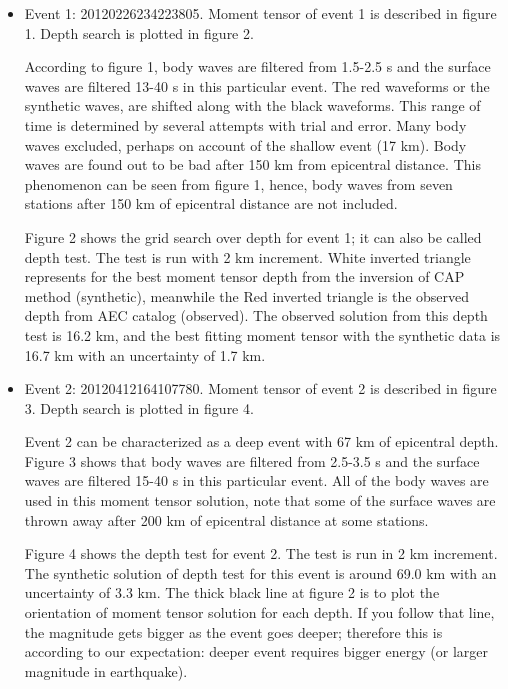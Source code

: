 \documentclass[11pt,titlepage,fleqn]{article}
\begin{document}
\begin{itemize}
\item Event 1: 20120226234223805. Moment tensor of event 1 is described in figure 1. Depth search is plotted in figure 2.

\vspace{2mm}

According to figure 1, body waves are filtered from 1.5-2.5 s and the surface waves are filtered 13-40 s in this particular event. The red waveforms or the synthetic waves, are shifted along with the black waveforms. This range of time is determined by several attempts with trial and error.  Many body waves excluded, perhaps on account of the shallow event (17 km). Body waves are found out to be bad after 150 km from epicentral distance. This phenomenon can be seen from figure 1, hence, body waves from seven stations after 150 km of epicentral distance are not included. 

Figure 2 shows the grid search over depth for event 1; it can also be called depth test. The test is run with 2 km increment. White inverted triangle represents for the best moment tensor depth from the inversion of CAP method (synthetic), meanwhile the Red inverted triangle is the observed depth from AEC catalog (observed). The observed solution from this depth test is 16.2 km, and the best fitting moment tensor with the synthetic data is 16.7 km with an uncertainty of 1.7 km.

\end{itemize}

\vspace{2mm}

 


\begin{itemize}


\item Event 2: 20120412164107780. Moment tensor of event 2 is described in figure 3. Depth search is plotted in figure 4.

\vspace{2mm}

Event 2 can be characterized as a deep event with 67 km of epicentral depth. Figure 3 shows that body waves are filtered from 2.5-3.5 s and the surface waves are filtered 15-40 s in this particular event.  All of the body waves are used in this moment tensor solution, note that some of the surface waves are thrown away after 200 km of epicentral distance at some stations. 

\vspace{2mm}

Figure 4 shows the depth test for event 2. The test is run in 2 km increment. The synthetic solution of depth test for this event is around 69.0 km with an uncertainty of 3.3 km. The thick black line at figure 2 is to plot the orientation of moment tensor solution for each depth. If you follow that  line, the magnitude gets bigger as the event goes deeper; therefore this is according to our expectation: deeper event requires bigger energy (or larger magnitude in earthquake). 


\end{itemize}
\end{document}
